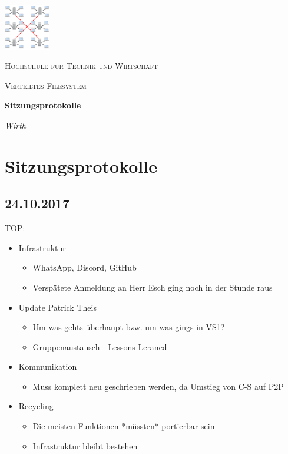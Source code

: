 \documentclass[a4paper,11pt]{article}
\begin{document}
\begin{titlepage}
	\centering
	\includegraphics[width=0.15\textwidth]{Federation.png}\par\vspace{1cm} %
	{\scshape\LARGE Hochschule f\"ur Technik und Wirtschaft  \par}
	\vspace{1cm}
	{\scshape\Large Verteiltes Filesystem\par}
	\vspace{1.5cm}
	{\huge\bfseries Sitzungsprotokolle \par}
	\vspace{2cm}
	{\Large\itshape Wirth\par}
	\vfill

	\vfill
	{\large \par}
\end{titlepage}
\tableofcontents
\pagebreak

\section{Sitzungsprotokolle}
\subsection{24.10.2017}
TOP:
\begin{itemize}
\setlength\itemsep{0em}
\item Infrastruktur
	\begin{itemize}
	\setlength\itemsep{0.2em}
		\item WhatsApp, Discord, GitHub
		\item Versp\"atete Anmeldung an Herr Esch ging noch in der Stunde raus
	\end{itemize} 
\item Update Patrick Theis
	\begin{itemize}
		\item Um was gehts \"uberhaupt bzw. um was gings in VS1?
		\item Gruppenaustausch - Lessons Leraned
	\end{itemize}
\item Kommunikation
	\begin{itemize}
		\item Muss komplett neu geschrieben werden, da Umstieg von C-S auf P2P
	\end{itemize}
\item Recycling
	\begin{itemize}
		\item Die meisten Funktionen *m\"ussten* portierbar sein
		\item Infrastruktur bleibt bestehen
	\end{itemize}
\end{itemize}
\end{document}
